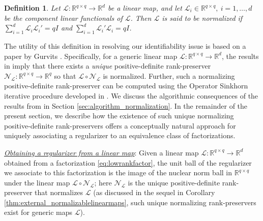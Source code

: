 \documentclass[11pt,letterpaper]{article}
\newtheorem{definition}{Definition}
\newcommand{\R}{\mathbb{R}}
\renewcommand{\L}{\mathcal{L}}
\begin{document}
\begin{definition}
Let $\L : \R^{q \times q} \rightarrow \R^d$ be a linear map, and let $\L_{i} \in \R^{q \times q}, ~ i=1,\dots,d$ be the component linear functionals of $\L$.  Then $\L$ is said to be normalized if $\sum_{i=1}^d \L_{i} {\L_{i}}' = qI$ and $\sum_{i=1}^d {\L_{i}}' \L_{i} = qI$.
\end{definition}


The utility of this definition in resolving our identifiability issue is based on a paper by Gurvits  \cite{Gur:04}.  Specifically, for a generic linear map $\L : \R^{q \times q} \rightarrow \R^d$, the results in \cite{Gur:04} imply that there exists a \emph{unique} positive-definite rank-preserver $\mathcal{N}_\L : \R^{q \times q} \rightarrow \R^q$ so that $\L \circ \mathcal{N}_\L$ is normalized.  Further, such a normalizing positive-definite rank-preserver can be computed using the Operator Sinkhorn iterative procedure developed in \cite{Gur:04}.  We discuss the algorithmic consequences of the results from \cite{Gur:04} in Section \ref{sec:algorithm_normalization}.  In the remainder of the present section, we describe how the existence of such unique normalizing positive-definite rank-preservers offers a conceptually natural approach for uniquely associating a regularizer to an equivalence class of factorizations.

\underline{\emph{Obtaining a regularizer from a linear map}}: Given a linear map $\L : \R^{q \times q} \rightarrow \R^d$ obtained from a factorization \eqref{eq:lowrankfactor}, the unit ball of the regularizer we associate to this factorization is the image of the nuclear norm ball in $\R^{q \times q}$ under the linear map $\L \circ \mathcal{N}_\L$; here $\mathcal{N}_\L$ is the unique positive-definite rank-preserver that normalizes $\L$ (as discussed in the sequel in Corollary \ref{thm:external_normalizablelinearmaps}, such unique normalizing rank-preservers exist for generic maps $\L$).
\end{document}
